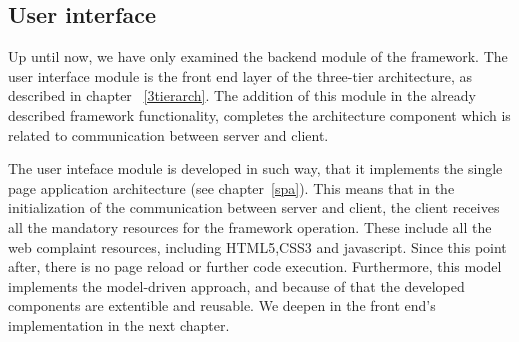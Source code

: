 \subsection{User interface}
Up until now, we have only examined the backend module of the framework. The user interface module is the front end layer of the three-tier architecture, as described in chapter ~\ref{3tierarch}. The addition of this module in the already described framework functionality, completes the architecture component which is related to communication between server and client. \par
	The user inteface module is developed in such way, that it implements the single page application architecture (see chapter~\ref{spa}). This means that in the initialization of the communication between server and client, the client receives all the mandatory resources for the framework operation. These include all the web complaint resources, including HTML5,CSS3 and javascript. Since this point after, there is no page reload or further code execution. Furthermore, this model implements the model-driven approach, and because of that the developed components are extentible and reusable. We deepen in the front end's implementation in the next chapter.


	